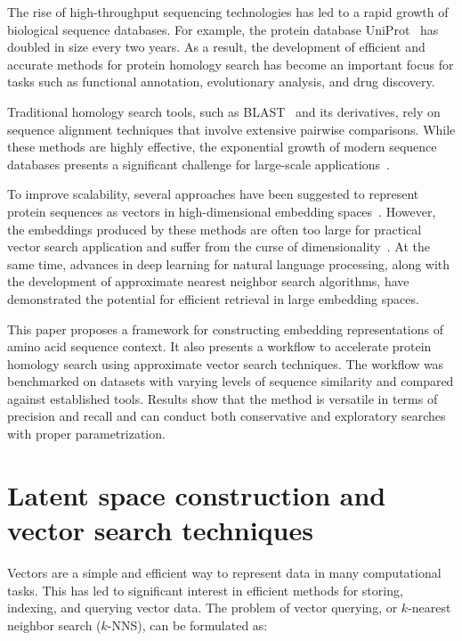 \documentclass[twoside,a4paper]{master}
\begin{document}
The rise of high-throughput sequencing technologies has led to a rapid growth of biological sequence databases. For example, the protein database UniProt~\cite{10.1093/nar/gky092} has doubled in size every two years. As a result, the development of efficient and accurate methods for protein homology search has become an important focus for tasks such as functional annotation, evolutionary analysis, and drug discovery.

Traditional homology search tools, such as BLAST~\cite{ALTSCHUL1990403} and its derivatives, rely on sequence alignment techniques that involve extensive pairwise comparisons. While these methods are highly effective, the exponential growth of modern sequence databases presents a significant challenge for large-scale applications~\cite{10.1093/bioinformatics/btad225}.

To improve scalability, several approaches have been suggested to represent protein sequences as vectors in high-dimensional embedding spaces~\cite{rives2021biological}. However, the embeddings produced by these methods are often too large for practical vector search application and suffer from the curse of dimensionality~\cite{nearestneighbormeaning}. At the same time, advances in deep learning for natural language processing, along with the development of approximate nearest neighbor search algorithms, have demonstrated the potential for efficient retrieval in large embedding spaces.

This paper proposes a framework for constructing embedding representations of amino acid sequence context. It also presents a workflow to accelerate protein homology search using approximate vector search techniques. The workflow was benchmarked on datasets with varying levels of sequence similarity and compared against established tools. Results show that the method is versatile in terms of precision and recall and can conduct both conservative and exploratory searches with proper parametrization.

\section{Latent space construction and vector search techniques}
Vectors are a simple and efficient way to represent data in many computational tasks. This has led to significant interest in efficient methods for storing, indexing, and querying vector data. The problem of vector querying, or \(k\)-nearest neighbor search (\(k\)-NNS), can be formulated as:
\end{document}
